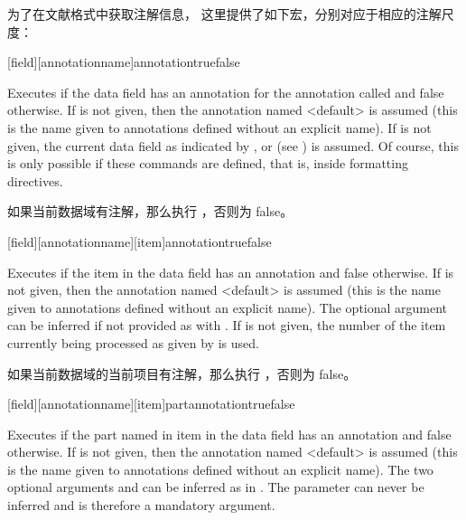 为了在文献格式中获取注解信息，
这里提供了如下宏，分别对应于相应的注解尺度：

\begin{ltxsyntax}


[field][annotationname]{annotation}{true}{false}


Executes  if the data field  has an annotation  for the annotation called  and false otherwise. If  is not given, then the annotation named <default> is assumed (this is the name given to annotations defined without an explicit name). If  is not given, the current data field as indicated by ,  or  (see ) is assumed. Of course, this is only possible if these commands are defined, that is, inside formatting directives.

如果当前数据域有注解，那么执行 ，否则为 false。

[field][annotationname][item]{annotation}{true}{false}


Executes  if the item  in the data field  has an annotation  and false otherwise. If  is not given, then the annotation named <default> is assumed (this is the name given to annotations defined without an explicit name). The optional argument  can be inferred if not provided as with . If  is not given, the number of the item currently being processed as given by  is used.

如果当前数据域的当前项目有注解，那么执行 ，否则为 false。


[field][annotationname][item]{part}{annotation}{true}{false}


Executes  if the part named  in item  in the data field  has an annotation  and false otherwise. If  is not given, then the annotation named <default> is assumed (this is the name given to annotations defined without an explicit name). The two optional arguments  and  can be inferred as in . The parameter  can never be inferred and is therefore a mandatory argument.


\end{ltxsyntax}
